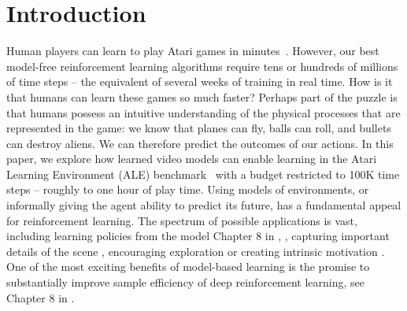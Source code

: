 


\section{Introduction}

Human players can learn to play Atari games in minutes~\cite{human_atari_minutes}. However, our best model-free reinforcement learning algorithms require tens or hundreds of millions of time steps -- the equivalent of several weeks of training in real time. How is it that humans can learn these games so much faster? Perhaps part of the puzzle is that humans possess an intuitive understanding of the physical processes that are represented in the game: we know that planes can fly, balls can roll, and bullets can destroy aliens. We can therefore predict the outcomes of our actions. In this paper, we explore how learned video models can enable learning in the Atari Learning Environment (ALE) benchmark~\cite{ale, ale2} with a budget restricted to 100K time steps -- roughly to one hour of play time.
Using models of environments, or informally giving the agent ability to predict its future, has a fundamental appeal for reinforcement learning. The spectrum of possible applications is vast, including learning policies
from the model Chapter 8 in \cite{sutton_barto_2017}, %
\cite{embed_to_control, deep_spatial, finn2016, ebert, hafner, piergiovanni, rybkin-pertsch}, capturing important details of the scene \cite{world_models}, encouraging exploration \cite{video_prediction} or creating intrinsic motivation \cite{pathak}.
One of the most exciting benefits of model-based learning is the promise to substantially improve sample efficiency of deep reinforcement learning, see Chapter 8 in \cite{sutton_barto_2017}.

